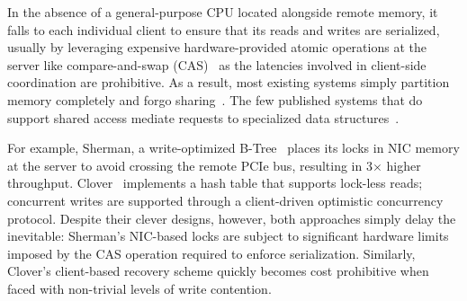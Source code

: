 

In the absence of a general-purpose CPU located alongside remote
memory, it falls to each individual client to ensure that its reads
and writes are serialized, usually by leveraging expensive
hardware-provided atomic operations at the server like
compare-and-swap (CAS)~\cite{design-guidelines} as the latencies
involved in client-side coordination are prohibitive.  As a result,
most existing systems simply partition memory completely and forgo
sharing~\cite{reigons,fastswap,legoos}.
%
The few published systems that do support shared access mediate
requests to specialized data structures~\cite{clover,sherman}.

For example, Sherman, a write-optimized
B-Tree~\cite{sherman} places its locks in NIC memory at the server to
avoid crossing the remote PCIe bus, resulting in 3$\times$ higher
throughput.  Clover~\cite{clover} implements a hash table that
supports lock-less reads; concurrent writes are supported through a
client-driven optimistic concurrency protocol.  Despite their clever
designs, however, both approaches simply delay the inevitable:
Sherman's NIC-based locks are subject to significant hardware limits
imposed by the CAS operation required to enforce serialization.
Similarly, Clover's client-based recovery scheme quickly becomes cost
prohibitive when faced with non-trivial levels of write contention.
%

